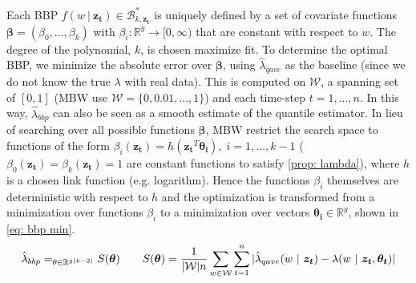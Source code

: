 \documentclass[12pt]{article}
\let\argmin\relax\DeclareMathOperator*{\argmin}{argmin}
\begin{document}
    Each BBP $f(w \ |\ \boldsymbol{z_t}) \in \mathcal{B}_{k, \boldsymbol{z_t}}^*$ is uniquely defined by a set of covariate functions $\boldsymbol{\beta} = (\beta_0,\dots,\beta_k)$ with $\beta_i : \mathbb{R}^g \to [0, \infty)$ that are constant with respect to $w$.
    The degree of the polynomial, $k$, is chosen maximize fit.
    To determine the optimal BBP, we minimize the absolute error over $\boldsymbol{\beta}$, using $\hat{\lambda}_{qave}$ as the baseline (since we do not know the true $\lambda$ with real data). 
    This is computed on $\mathcal{W}$, a spanning set of $[0, 1]$ (MBW use $\mathcal{W} = \{ 0,0.01,\dots,1 \}$) and each time-step $t = 1,\dots,n$.
    In this way, $\hat{\lambda}_{bbp}$ can also be seen as a smooth estimate of the quantile estimator.
    In lieu of searching over all possible functions $\boldsymbol{\beta}$, MBW restrict the search space to functions of the form $\beta_i(\boldsymbol{z_t}) = h(\boldsymbol{z_t}^T \boldsymbol{\theta_i}), \; i = 1,\dots, k - 1$ ($\beta_0(\boldsymbol{z_t}) = \beta_k(\boldsymbol{z_t}) = 1$ are constant functions to satisfy \cref{prop: lambda}), where $h$ is a chosen link function (e.g. logarithm).
    Hence the functions $\beta_i$ themselves are deterministic with respect to $h$ and the optimization is transformed from a minimization over functions $\beta_i$ to a minimization over vectors $\boldsymbol{\theta_i} \in \mathbb{R}^g$, shown in \cref{eq: bbp min}.
    \begin{equation} \label{eq: bbp min}
      \hat{\lambda}_{bbp} = \argmin_{\theta \in \mathbb{R}^{g(k - 2)}} S(\boldsymbol{\theta}) \qquad S(\boldsymbol{\theta}) = \frac{1}{|\mathcal{W}| n} \sum_{w \in \mathcal{W}}\sum_{t = 1}^n |\hat{\lambda}_{qave}(w \ |\ \boldsymbol{z_t}) - \lambda(w \ |\ \boldsymbol{z_t}, \boldsymbol{\theta_t})| 
    \end{equation}
\end{document}
